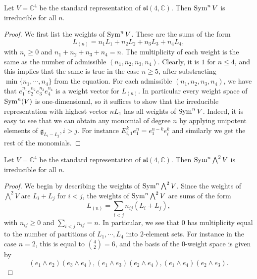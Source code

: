 \documentclass{report}
\begin{document}
\begin{exercise}[Exercise 15.11]\label{ex:irreducible_symmetric_powers}
    Let $V = \mathbb C^4$ be the standard representation of $\mathfrak{sl}(4, \mathbb C)$.
    Then $\operatorname{Sym}^n V$ is irreducible for all $n$.
\end{exercise}
\begin{proof}
    We first list the weights of $\operatorname{Sym}^n V$.
    These are the sums of the form 
    \[
    L_{(n)} = n_1 L_1 + n_2 L_2 + n_3 L_3 + n_4 L_4,
    \]
    with $n_i \geq 0$ and $n_1 + n_2 + n_3 + n_4 = n$.
    The multiplicity of each weight is the same as the number of admissible $(n_1, n_2, n_3, n_4)$.
    Clearly, it is $1$ for $n \leq 4$, and this implies that the same is true in the case $n \geq 5$, after substracting $\min\{n_1, \cdots, n_4\}$ from the equation.
    For each admissible $(n_1, n_2, n_3, n_4)$, we have that $e_1^{n_1} e_2^{n_2} e_3^{n_3} e_4^{n_4}$ is a weight vector for $L_{(n)}$.
    In particular every weight space of $\operatorname{Sym}^n(V)$ is one-dimensional, so it suffices to show that the irreducible representation with highest vector $n L_1$ has all weights of $\operatorname{Sym}^n V$.
    Indeed, it is easy to see that we can obtain any monomial of degree $n$ by applying unipotent elements of $\mathfrak g_{L_i - L_j}, i > j$.
    For instance $E_{i,1}^k e_1^n = e_1^{n-k} e_i^k$ and similarly we get the rest of the monomials. 
\end{proof}

\begin{exercise}
    Let $V = \mathbb C^4$ be the standard representation of $\mathfrak{sl}(4, \mathbb C)$.
    Then $\operatorname{Sym}^n \bigwedge^2 V$ is irreducible for all $n$.
\end{exercise}
\begin{proof}
    We begin by describing the weights of $\operatorname{Sym}^n \bigwedge^2 V$.
    Since the weights of $\bigwedge^2 V$ are $L_i + L_j$ for $i < j$, the weights of $\operatorname{Sym}^n \bigwedge^2 V$ are sums of the form
    \[
    L_{(n)} = \sum_{i < j} n_{ij} (L_i + L_j),
    \]
    with $n_{ij} \geq 0$ and $\sum_{i < j} n_{ij} = n$.
    In particular, we see that $0$ has multiplicity equal to the number of partitions of ${L_1, \cdots, L_4}$ into $2$-element sets.
    For instance in the case $n=2$, this is equal to $\binom{4}{2} = 6$, and the basis of the $0$-weight space is given by
    \[
    \left(e_1 \wedge e_2\right) (e_3 \wedge e_4), \left(e_1 \wedge e_3\right) (e_2 \wedge e_4), \left(e_1 \wedge e_4\right) (e_2 \wedge e_3).
    \]
\end{proof}
\end{document}
